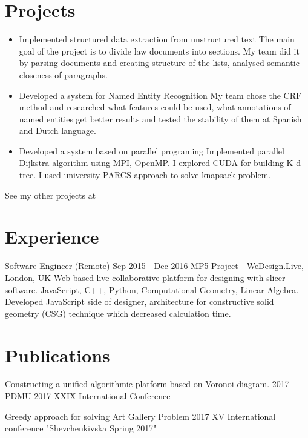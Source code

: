 \documentclass[letterpaper]{twentysecondcv} %
\begin{document}
\section{Projects}
\begin{itemize}
    \item \projectItem
        {Implemented structured data extraction from unstructured text }
        {The main goal of the project is to divide law documents into sections. My team did it by parsing documents and creating structure of the lists, analysed semantic closeness of paragraphs.}
	\item \projectItem
        {Developed a system for Named Entity Recognition}
        {My team chose the CRF method and researched what features could be used, what annotations of named entities get better results and tested the stability of them at Spanish and Dutch language.}
    \item \projectItem
        {Developed a system based on parallel programing}
        {Implemented parallel Dijkstra algorithm using MPI, OpenMP. I explored CUDA for building K-d tree. I used university PARCS approach to solve knapsack problem.}
\end{itemize}
\projectItem
    {See my other projects at  }
    {}


\section{Experience}

\begin{twenty} %
	
    \twentyitemwithoutbegin
   	    {}
        {Software Engineer (Remote)}
        {Sep 2015 - Dec 2016 }
        {MP5 Project - WeDesign.Live, London, UK}
        {Web based live collaborative platform for designing with slicer software.
        {JavaScript, C++, Python, Computational Geometry, Linear Algebra. Developed JavaScript side of designer, architecture for constructive solid geometry (CSG) technique which decreased calculation time.
        }
        }
\end{twenty}
\section{Publications}
\begin{twenty}
	\twentyitemwithoutbegin
    	{}
        {Constructing a unified algorithmic platform based on Voronoi diagram.}
        {2017}
        {PDMU-2017 XXIX International Conference}
        {}
        \end{twenty}
\begin{twenty}
	\twentyitemwithoutbegin
    	{}
        {Greedy approach for solving Art Gallery Problem}
        {2017}
        {XV International conference "Shevchenkivska Spring 2017"}
        {}
\end{twenty}
\end{document}
